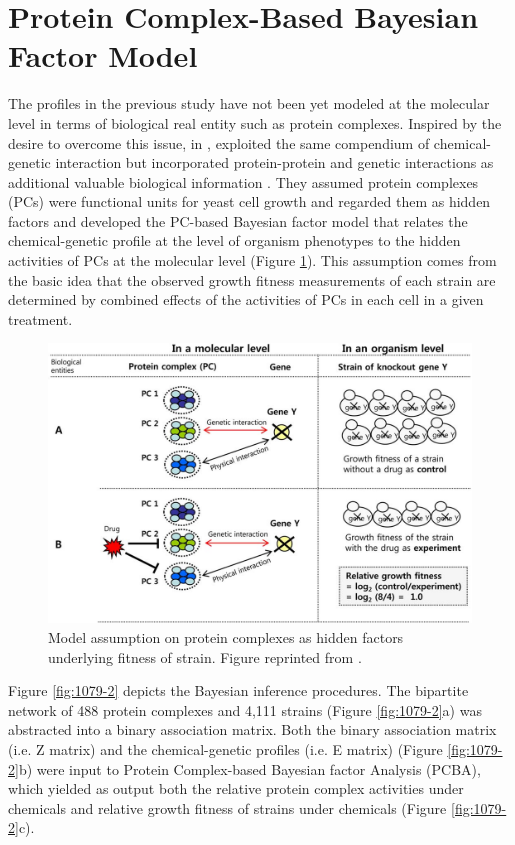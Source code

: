 \documentclass[12pt,fullpage,singlespace]{article}
\begin{document}
\section{Protein Complex-Based Bayesian Factor Model}

The profiles in the previous study \citep{1078} have not been yet modeled at the molecular level in terms of biological real entity such as protein complexes. Inspired by the desire to overcome this issue, in \citeyear{1079},  exploited the same compendium of chemical-genetic interaction but incorporated protein-protein and genetic interactions as additional valuable biological information \citep{1079}. They assumed protein complexes (PCs) were functional units for yeast cell growth and regarded them as hidden factors and developed the PC-based Bayesian factor model that relates the chemical-genetic profile at the level of organism phenotypes to the hidden activities of PCs at the molecular level (Figure \ref{fig:1079-1}). This assumption comes from the basic idea that the observed growth fitness measurements of each strain are determined by combined effects of the activities of PCs in each cell in a given treatment.

\begin{figure}
\centering
\includegraphics[width=\linewidth]{1079-1.png}
\caption{Model assumption on protein complexes as hidden factors underlying fitness of strain. Figure reprinted from \citep{1079}.}
\label{fig:1079-1}
\end{figure}

Figure \ref{fig:1079-2} depicts the Bayesian inference procedures. The bipartite network of 488 protein complexes and 4,111 strains (Figure \ref{fig:1079-2}a) was abstracted into a binary association matrix. Both the binary association matrix (i.e. Z matrix) and the chemical-genetic profiles (i.e. E matrix) (Figure \ref{fig:1079-2}b) were input to Protein Complex-based Bayesian factor Analysis (PCBA), which yielded as output both the relative protein complex activities under chemicals and relative growth fitness of strains under chemicals (Figure \ref{fig:1079-2}c).
\end{document}
